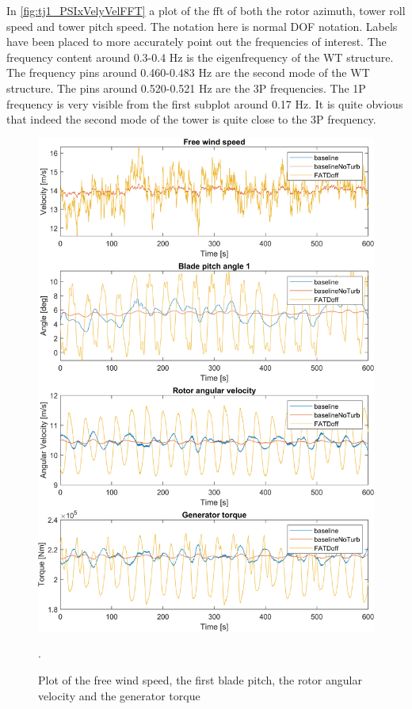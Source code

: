 In \cref{fig:tj1_PSIxVelyVelFFT} a plot of the fft of both the rotor azimuth, tower roll speed and tower pitch speed. The notation here is normal DOF notation. Labels have been placed to more accurately point out the frequencies of interest. The frequency content around 0.3-0.4 Hz is the eigenfrequency of the WT structure. The frequency pins around 0.460-0.483 Hz are the second mode of the WT structure. The pins around 0.520-0.521 Hz are the 3P frequencies. The 1P frequency is very visible from the first subplot around 0.17 Hz. It is quite obvious that indeed the second mode of the tower is quite close to the 3P frequency. 

\begin{figure}[ht]
	\centering
	\includegraphics[width=0.8\linewidth]{Graphics/TestResults/tj01/VfreeToMgen.png}
	\caption{Plot of the free wind speed, the first blade pitch, the rotor angular velocity and the generator torque}.
	\label{fig:tj1:vfreetomgen}
\end{figure}

